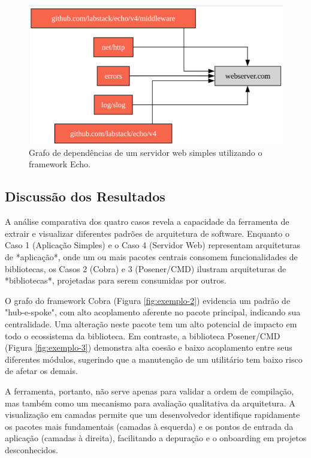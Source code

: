 \documentclass[12pt]{article}
\begin{document}
\begin{figure}[htbp]
\centering
\includegraphics[width=1\textwidth]{examples/webserver.png}
\caption{Grafo de dependências de um servidor web simples utilizando o framework Echo.}
\label{fig:exemplo-4}
\end{figure}

\FloatBarrier 

\subsection{Discussão dos Resultados}
A análise comparativa dos quatro casos revela a capacidade da ferramenta de extrair e visualizar diferentes padrões de arquitetura de software. Enquanto o Caso 1 (Aplicação Simples) e o Caso 4 (Servidor Web) representam arquiteturas de *aplicação*, onde um ou mais pacotes centrais consomem funcionalidades de bibliotecas, os Casos 2 (Cobra) e 3 (Posener/CMD) ilustram arquiteturas de *bibliotecas*, projetadas para serem consumidas por outros.

O grafo do framework Cobra (Figura \ref{fig:exemplo-2}) evidencia um padrão de "hub-e-spoke", com alto acoplamento aferente no pacote principal, indicando sua centralidade. Uma alteração neste pacote tem um alto potencial de impacto em todo o ecossistema da biblioteca. Em contraste, a biblioteca Posener/CMD (Figura \ref{fig:exemplo-3}) demonstra alta coesão e baixo acoplamento entre seus diferentes módulos, sugerindo que a manutenção de um utilitário tem baixo risco de afetar os demais.

A ferramenta, portanto, não serve apenas para validar a ordem de compilação, mas também como um mecanismo para avaliação qualitativa da arquitetura. A visualização em camadas permite que um desenvolvedor identifique rapidamente os pacotes mais fundamentais (camadas à esquerda) e os pontos de entrada da aplicação (camadas à direita), facilitando a depuração e o onboarding em projetos desconhecidos.
\end{document}
